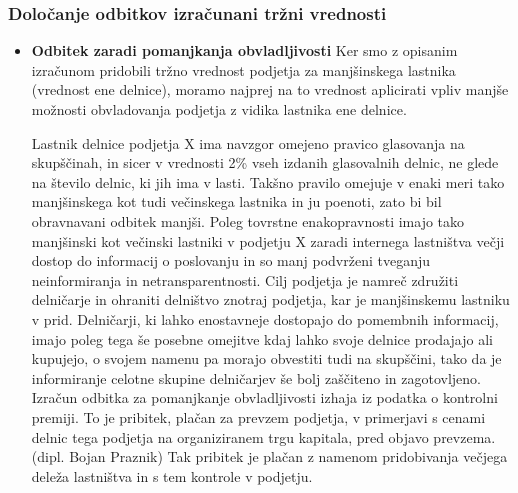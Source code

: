\documentclass[12pt,a4paper]{amsart}
\theoremstyle{definition} %
\theoremstyle{plain} %
\begin{document}
\subsubsection{Določanje odbitkov izračunani tržni vrednosti}
\begin{itemize}
\item{\textbf{Odbitek zaradi pomanjkanja obvladljivosti}}
Ker smo z opisanim izračunom pridobili tržno vrednost podjetja za manjšinskega lastnika (vrednost ene delnice), moramo najprej na to vrednost aplicirati vpliv manjše možnosti obvladovanja podjetja z vidika lastnika ene delnice.\par
Lastnik delnice podjetja X ima navzgor omejeno pravico glasovanja na skupščinah, in sicer v vrednosti 2\% vseh izdanih glasovalnih delnic, ne glede na število delnic, ki jih ima v lasti. Takšno pravilo omejuje v enaki meri tako manjšinskega kot tudi večinskega lastnika in ju poenoti, zato bi bil obravnavani odbitek manjši. Poleg tovrstne enakopravnosti imajo tako manjšinski kot večinski lastniki v podjetju X zaradi internega lastništva večji dostop do informacij o poslovanju in so manj podvrženi tveganju neinformiranja in netransparentnosti. Cilj podjetja je namreč združiti delničarje in ohraniti delništvo znotraj podjetja, kar je manjšinskemu lastniku v prid. Delničarji, ki lahko enostavneje dostopajo do pomembnih informacij, imajo poleg tega še posebne omejitve kdaj lahko svoje delnice prodajajo ali kupujejo, o svojem namenu pa morajo obvestiti tudi na skupščini, tako da je informiranje celotne skupine delničarjev še bolj zaščiteno in zagotovljeno. \\
Izračun odbitka za pomanjkanje obvladljivosti izhaja iz podatka o kontrolni premiji. To je pribitek, plačan za prevzem podjetja, v primerjavi s cenami delnic tega podjetja na organiziranem trgu kapitala, pred objavo prevzema. (dipl. Bojan Praznik) Tak pribitek je plačan z namenom pridobivanja večjega deleža lastništva in s tem kontrole v podjetju.\\

\end{itemize}
\end{document}
